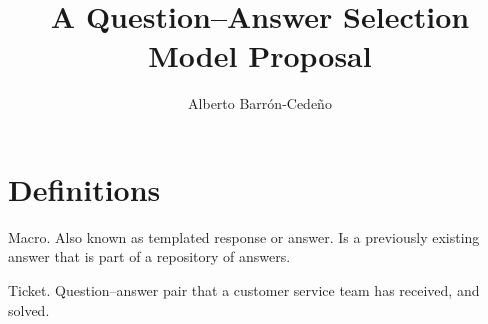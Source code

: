 \documentclass[11pt]{article}
\title{A Question--Answer Selection Model Proposal}
\author{Alberto Barr\'on-Cede\~no}
\date{}
\begin{document}
\maketitle

% 
% 
% 
% 
% 

\section{Definitions}
\label{sec:def}

\begin{description}
\item{Macro.} Also known as templated response or answer. Is a previously 
existing answer that is part of a repository of answers.
\item{Ticket.} Question--answer pair that a customer service team has received, 
and solved. 
\end{description}
\end{document}
